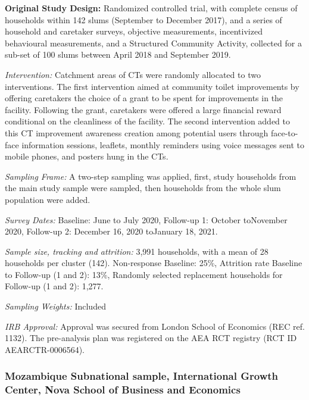\documentclass[
  12pt,
]{article}
\begin{document}
\textbf{Original Study Design:} Randomized controlled trial, with complete census of households within 142 slums (September to December 2017), and a series of household and caretaker surveys, objective measurements, incentivized behavioural measurements, and a Structured Community Activity, collected for a sub-set of 100 slums between April 2018 and September 2019.

\emph{Intervention:} Catchment areas of CTs were randomly allocated to two interventions. The first intervention aimed at community toilet improvements by offering caretakers the choice of a grant to be spent for improvements in the facility. Following the grant, caretakers were offered a large financial reward conditional on the cleanliness of the facility. The second intervention added to this CT improvement awareness creation among potential users through face-to-face information sessions, leaflets, monthly reminders using voice messages sent to mobile phones, and posters hung in the CTs.

\emph{Sampling Frame:} A two-step sampling was applied, first, study households from the main study sample were sampled, then households from the whole slum population were added.

\emph{Survey Dates:}
Baseline: June to July 2020, Follow-up 1: October toNovember 2020, Follow-up 2: December 16, 2020 toJanuary 18, 2021.

\emph{Sample size, tracking and attrition:} 3,991 households, with a mean of 28 households per cluster (142). Non-response Baseline: 25\%, Attrition rate Baseline to Follow-up (1 and 2): 13\%, Randomly selected replacement households for Follow-up (1 and 2): 1,277.

\emph{Sampling Weights:} Included

\emph{IRB Approval:} Approval was secured from London School of Economics (REC ref. 1132). The pre-analysis plan was registered on the AEA RCT registry (RCT ID AEARCTR-0006564).

\hypertarget{mozambique-subnational-sample-international-growth-center-nova-school-of-business-and-economics}{%
\subsubsection*{Mozambique Subnational sample, International Growth Center, Nova School of Business and Economics}\label{mozambique-subnational-sample-international-growth-center-nova-school-of-business-and-economics}}
\end{document}
